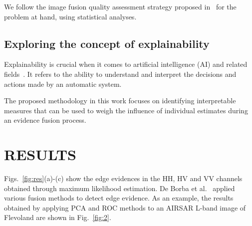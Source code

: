 \documentclass{article}
\begin{document}
We follow the image fusion quality assessment strategy proposed in~\cite{Li2010, Somvanshi2017,Nikola2015} for the problem at hand, using statistical analyses.

%
\subsection{Exploring the concept of explainability}

Explainability is crucial when it comes to artificial intelligence (AI) and related fields~\cite{Vilone2021}. 
It refers to the ability to understand and interpret the decisions and actions made by an automatic system. 

The proposed methodology in this work focuses on identifying interpretable measures that can be used to weigh the influence of individual estimates during an evidence fusion process.
%
 \vspace{-0.2cm}
\section{RESULTS}
\vspace{-0.2cm}
%
Figs.~\ref{fig:res}(a)-(c) show the edge evidences in the HH, HV and VV channels obtained through maximum likelihood estimation.
De Borba et al.~\cite{DeBorba2020} applied various fusion methods to detect edge evidence. 
As an example, the results obtained by applying PCA and ROC methods to an AIRSAR L-band image of Flevoland are shown in Fig.~\ref{fig:2}.%
\end{document}
